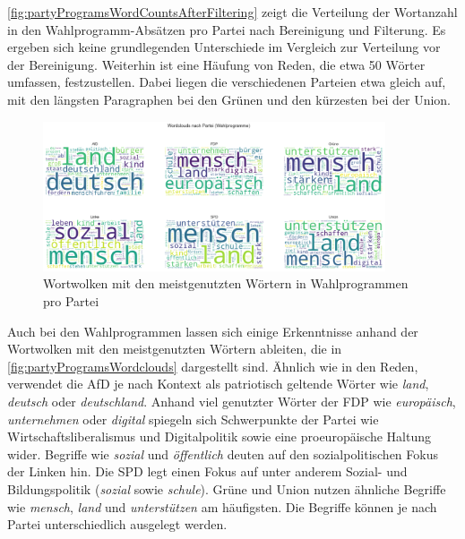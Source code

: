 \autoref{fig:partyProgramsWordCountsAfterFiltering} zeigt die Verteilung der Wortanzahl in den Wahlprogramm-Absätzen pro Partei nach Bereinigung und Filterung. Es ergeben sich keine grundlegenden Unterschiede im Vergleich zur Verteilung vor der Bereinigung. Weiterhin ist eine Häufung von Reden, die etwa \num{50} Wörter umfassen, festzustellen. Dabei liegen die verschiedenen Parteien etwa gleich auf, mit den längsten Paragraphen bei den Grünen und den kürzesten bei der Union.

\begin{figure}[H]
    \centering
    \includegraphics[width=0.9\textwidth]{data/images/party_programs/party_programs_wordclouds.png}
    \caption{Wortwolken mit den meistgenutzten Wörtern in Wahlprogrammen pro Partei} \label{fig:partyProgramsWordclouds}
\end{figure}

Auch bei den Wahlprogrammen lassen sich einige Erkenntnisse anhand der Wortwolken mit den meistgenutzten Wörtern ableiten, die in \autoref{fig:partyProgramsWordclouds} dargestellt sind. Ähnlich wie in den Reden, verwendet die \ac{AfD} je nach Kontext als patriotisch geltende Wörter wie \textit{land}, \textit{deutsch} oder \textit{deutschland}. Anhand viel genutzter Wörter der \ac{FDP} wie \textit{europäisch}, \textit{unternehmen} oder \textit{digital} spiegeln sich Schwerpunkte der Partei wie Wirtschaftsliberalismus und Digitalpolitik sowie eine proeuropäische Haltung wider. Begriffe wie \textit{sozial} und \textit{öffentlich} deuten auf den sozialpolitischen Fokus der Linken hin. Die \ac{SPD} legt einen Fokus auf unter anderem Sozial- und Bildungspolitik (\textit{sozial} sowie \textit{schule}). Grüne und Union nutzen ähnliche Begriffe wie \textit{mensch}, \textit{land} und \textit{unterstützen} am häufigsten. Die Begriffe können je nach Partei unterschiedlich ausgelegt werden.

